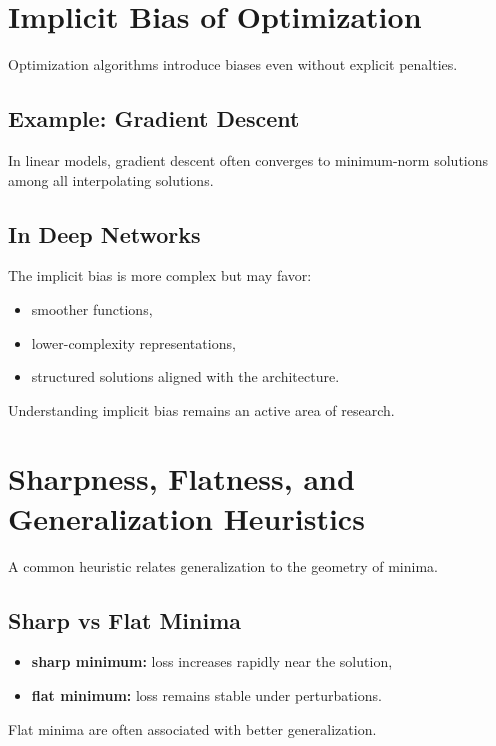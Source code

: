 \section{Implicit Bias of Optimization}

Optimization algorithms introduce biases even without explicit penalties.

\subsection{Example: Gradient Descent}

In linear models, gradient descent often converges to minimum-norm solutions among all interpolating solutions.

\subsection{In Deep Networks}

The implicit bias is more complex but may favor:
\begin{itemize}
    \item smoother functions,
    \item lower-complexity representations,
    \item structured solutions aligned with the architecture.
\end{itemize}

Understanding implicit bias remains an active area of research.

\section{Sharpness, Flatness, and Generalization Heuristics}

A common heuristic relates generalization to the geometry of minima.

\subsection{Sharp vs Flat Minima}

\begin{itemize}
    \item \textbf{sharp minimum:} loss increases rapidly near the solution,
    \item \textbf{flat minimum:} loss remains stable under perturbations.
\end{itemize}

Flat minima are often associated with better generalization.

